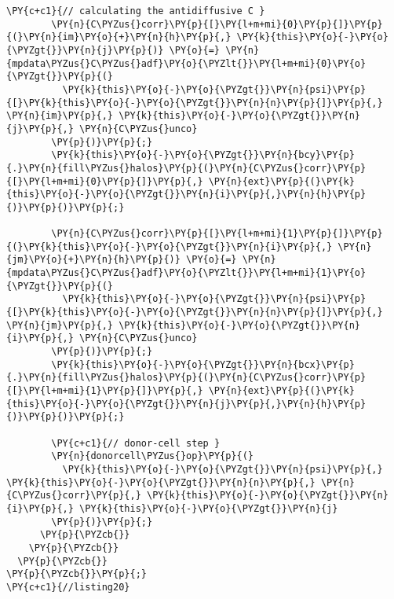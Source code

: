 \begin{Verbatim}[commandchars=\\\{\}]
        \PY{c+c1}{// calculating the antidiffusive C }
        \PY{n}{C\PYZus{}corr}\PY{p}{[}\PY{l+m+mi}{0}\PY{p}{]}\PY{p}{(}\PY{n}{im}\PY{o}{+}\PY{n}{h}\PY{p}{,} \PY{k}{this}\PY{o}{-}\PY{o}{\PYZgt{}}\PY{n}{j}\PY{p}{)} \PY{o}{=} \PY{n}{mpdata\PYZus{}C\PYZus{}adf}\PY{o}{\PYZlt{}}\PY{l+m+mi}{0}\PY{o}{\PYZgt{}}\PY{p}{(}
          \PY{k}{this}\PY{o}{-}\PY{o}{\PYZgt{}}\PY{n}{psi}\PY{p}{[}\PY{k}{this}\PY{o}{-}\PY{o}{\PYZgt{}}\PY{n}{n}\PY{p}{]}\PY{p}{,} \PY{n}{im}\PY{p}{,} \PY{k}{this}\PY{o}{-}\PY{o}{\PYZgt{}}\PY{n}{j}\PY{p}{,} \PY{n}{C\PYZus{}unco}
        \PY{p}{)}\PY{p}{;}
        \PY{k}{this}\PY{o}{-}\PY{o}{\PYZgt{}}\PY{n}{bcy}\PY{p}{.}\PY{n}{fill\PYZus{}halos}\PY{p}{(}\PY{n}{C\PYZus{}corr}\PY{p}{[}\PY{l+m+mi}{0}\PY{p}{]}\PY{p}{,} \PY{n}{ext}\PY{p}{(}\PY{k}{this}\PY{o}{-}\PY{o}{\PYZgt{}}\PY{n}{i}\PY{p}{,}\PY{n}{h}\PY{p}{)}\PY{p}{)}\PY{p}{;}

        \PY{n}{C\PYZus{}corr}\PY{p}{[}\PY{l+m+mi}{1}\PY{p}{]}\PY{p}{(}\PY{k}{this}\PY{o}{-}\PY{o}{\PYZgt{}}\PY{n}{i}\PY{p}{,} \PY{n}{jm}\PY{o}{+}\PY{n}{h}\PY{p}{)} \PY{o}{=} \PY{n}{mpdata\PYZus{}C\PYZus{}adf}\PY{o}{\PYZlt{}}\PY{l+m+mi}{1}\PY{o}{\PYZgt{}}\PY{p}{(}
          \PY{k}{this}\PY{o}{-}\PY{o}{\PYZgt{}}\PY{n}{psi}\PY{p}{[}\PY{k}{this}\PY{o}{-}\PY{o}{\PYZgt{}}\PY{n}{n}\PY{p}{]}\PY{p}{,} \PY{n}{jm}\PY{p}{,} \PY{k}{this}\PY{o}{-}\PY{o}{\PYZgt{}}\PY{n}{i}\PY{p}{,} \PY{n}{C\PYZus{}unco}
        \PY{p}{)}\PY{p}{;}
        \PY{k}{this}\PY{o}{-}\PY{o}{\PYZgt{}}\PY{n}{bcx}\PY{p}{.}\PY{n}{fill\PYZus{}halos}\PY{p}{(}\PY{n}{C\PYZus{}corr}\PY{p}{[}\PY{l+m+mi}{1}\PY{p}{]}\PY{p}{,} \PY{n}{ext}\PY{p}{(}\PY{k}{this}\PY{o}{-}\PY{o}{\PYZgt{}}\PY{n}{j}\PY{p}{,}\PY{n}{h}\PY{p}{)}\PY{p}{)}\PY{p}{;}

        \PY{c+c1}{// donor-cell step }
        \PY{n}{donorcell\PYZus{}op}\PY{p}{(}
          \PY{k}{this}\PY{o}{-}\PY{o}{\PYZgt{}}\PY{n}{psi}\PY{p}{,} \PY{k}{this}\PY{o}{-}\PY{o}{\PYZgt{}}\PY{n}{n}\PY{p}{,} \PY{n}{C\PYZus{}corr}\PY{p}{,} \PY{k}{this}\PY{o}{-}\PY{o}{\PYZgt{}}\PY{n}{i}\PY{p}{,} \PY{k}{this}\PY{o}{-}\PY{o}{\PYZgt{}}\PY{n}{j}
        \PY{p}{)}\PY{p}{;}
      \PY{p}{\PYZcb{}}
    \PY{p}{\PYZcb{}}
  \PY{p}{\PYZcb{}}
\PY{p}{\PYZcb{}}\PY{p}{;}
\PY{c+c1}{//listing20}
\end{Verbatim}
